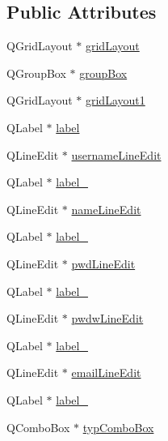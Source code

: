\subsection*{Public Attributes}
\begin{CompactItemize}
\item 
QGridLayout $\ast$ \hyperlink{class_ui___neuer_user_dialog_class_e427bb1509f6655a70388e6b4c5fdef1}{gridLayout}
\item 
QGroupBox $\ast$ \hyperlink{class_ui___neuer_user_dialog_class_b9f51227b66d41b825f04bfccdf9168f}{groupBox}
\item 
QGridLayout $\ast$ \hyperlink{class_ui___neuer_user_dialog_class_3b009c5e5d66cae9e5ef400042efbcd2}{gridLayout1}
\item 
QLabel $\ast$ \hyperlink{class_ui___neuer_user_dialog_class_58e8d47ef6b5082b660690563d9ab42a}{label}
\item 
QLineEdit $\ast$ \hyperlink{class_ui___neuer_user_dialog_class_ee98382add2320120c64b7c1ac79e4dc}{usernameLineEdit}
\item 
QLabel $\ast$ \hyperlink{class_ui___neuer_user_dialog_class_58ec311f856ef3b73e496a2b2bac8019}{label\_}
\item 
QLineEdit $\ast$ \hyperlink{class_ui___neuer_user_dialog_class_5d7ac7d442a96686d9fa74ea43e9fe83}{nameLineEdit}
\item 
QLabel $\ast$ \hyperlink{class_ui___neuer_user_dialog_class_77eaebd40d06c047adadef94f8b5ffd5}{label\_}
\item 
QLineEdit $\ast$ \hyperlink{class_ui___neuer_user_dialog_class_ac993e337eddb7945b3a93fdcc06572d}{pwdLineEdit}
\item 
QLabel $\ast$ \hyperlink{class_ui___neuer_user_dialog_class_381e9cf8cf008afb4e1d81749e8a840b}{label\_}
\item 
QLineEdit $\ast$ \hyperlink{class_ui___neuer_user_dialog_class_41b5e6f827c399209e918157bd1035d6}{pwdwLineEdit}
\item 
QLabel $\ast$ \hyperlink{class_ui___neuer_user_dialog_class_8ed918214691cdc84820230531e808ea}{label\_}
\item 
QLineEdit $\ast$ \hyperlink{class_ui___neuer_user_dialog_class_05a279f8550cee40c692ae767f1331db}{emailLineEdit}
\item 
QLabel $\ast$ \hyperlink{class_ui___neuer_user_dialog_class_5f9d776188c12dcffe8c31af6db843f4}{label\_}
\item 
QComboBox $\ast$ \hyperlink{class_ui___neuer_user_dialog_class_8710526a0d5b3dd714dc2991520a33e4}{typComboBox}
\item 

\end{CompactItemize}
